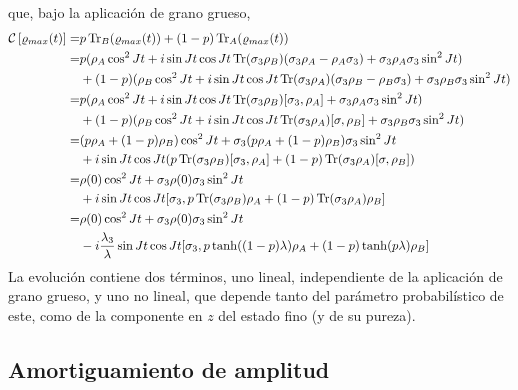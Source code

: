 que, bajo la aplicación de grano grueso,
\begin{align*}
    \mathcal{C}\left[\varrho_{max}(t)\right]=&p\Tr_{B}(\varrho_{max}(t))+(1-p)\Tr_{A}(\varrho_{max}(t))\\
    =&p(\rho_{A}\cos^{2}{Jt}+i\sin{Jt}\cos{Jt}\Tr(\sigma_{3} \rho_{B})(\sigma_{3}\rho_{A}- \rho_{A}\sigma_{3})+\sigma_{3}\rho_{A}\sigma_{3}\sin^{2}{Jt})\\
    &+(1-p)(\rho_{B}\cos^{2}{Jt}+i\sin{Jt}\cos{Jt}\Tr(\sigma_{3} \rho_{A})(\sigma_{3}\rho_{B}- \rho_{B}\sigma_{3})+\sigma_{3}\rho_{B}\sigma_{3}\sin^{2}{Jt})\\
    =&p(\rho_{A}\cos^{2}{Jt}+i\sin{Jt}\cos{Jt}\Tr(\sigma_{3} \rho_{B})[\sigma_{3},\rho_{A}]+\sigma_{3}\rho_{A}\sigma_{3}\sin^{2}{Jt})\\
    &+(1-p)(\rho_{B}\cos^{2}{Jt}+i\sin{Jt}\cos{Jt}\Tr(\sigma_{3} \rho_{A})[\sigma,\rho_{B}]+\sigma_{3}\rho_{B}\sigma_{3}\sin^{2}{Jt})\\
    =&(p\rho_{A}+(1-p)\rho_{B})\cos^{2}{Jt}+\sigma_{3}(p\rho_{A}+(1-p)\rho_{B})\sigma_{3}\sin^{2}{Jt}\\
    &+i\sin{Jt}\cos{Jt}(p\Tr(\sigma_{3} \rho_{B})[\sigma_{3},\rho_{A}]+(1-p)\Tr(\sigma_{3} \rho_{A})[\sigma,\rho_{B}])\\
    =&\rho(0)\cos^{2}{Jt}+\sigma_{3}\rho(0)\sigma_{3}\sin^{2}{Jt}\\
    &+i\sin{Jt}\cos{Jt}[\sigma_{3},p\Tr(\sigma_{3} \rho_{B})\rho_{A}+(1-p)\Tr(\sigma_{3} \rho_{A})\rho_{B}]\\
    =&\rho(0)\cos^{2}{Jt}+\sigma_{3}\rho(0)\sigma_{3}\sin^{2}{Jt}\\
    &-i\frac{\lambda_{3}}{\lambda}\sin{Jt}\cos{Jt}[\sigma_{3},p\tanh((1-p)\lambda)\rho_{A}+(1-p)\tanh(p\lambda)\rho_{B}]
\end{align*}	
La evolución contiene dos términos, uno lineal, independiente de la aplicación de grano grueso, y uno no lineal, que depende tanto del parámetro probabilístico de este, como de la componente en $z$ del estado fino (y de su pureza).  

\subsection{Amortiguamiento de amplitud}